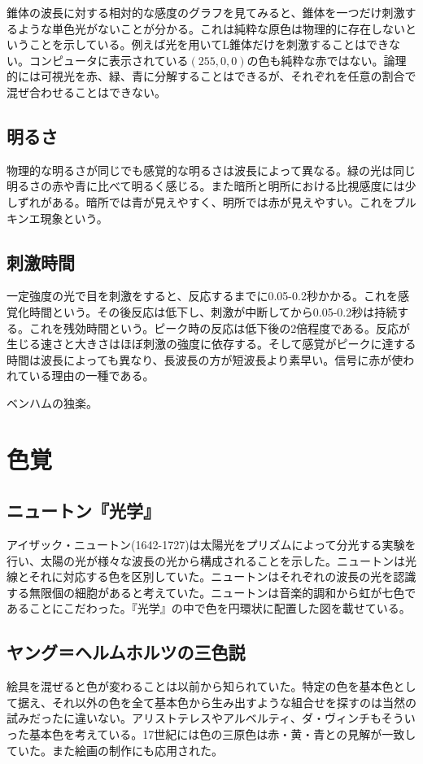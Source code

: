 	錐体の波長に対する相対的な感度のグラフを見てみると、錐体を一つだけ刺激するような単色光がないことが分かる。これは純粋な原色は物理的に存在しないということを示している。例えば光を用いてL錐体だけを刺激することはできない。コンピュータに表示されている$(255, 0, 0)$の色も純粋な赤ではない。論理的には可視光を赤、緑、青に分解することはできるが、それぞれを任意の割合で混ぜ合わせることはできない。

	\subsection{明るさ}
		物理的な明るさが同じでも感覚的な明るさは波長によって異なる。緑の光は同じ明るさの赤や青に比べて明るく感じる。また暗所と明所における比視感度には少しずれがある。暗所では青が見えやすく、明所では赤が見えやすい。これをプルキンエ現象という。
	\subsection{刺激時間}
		一定強度の光で目を刺激をすると、反応するまでに0.05-0.2秒かかる。これを感覚化時間という。その後反応は低下し、刺激が中断してから0.05-0.2秒は持続する。これを残効時間という。ピーク時の反応は低下後の2倍程度である。反応が生じる速さと大きさはほぼ刺激の強度に依存する。そして感覚がピークに達する時間は波長によっても異なり、長波長の方が短波長より素早い。信号に赤が使われている理由の一種である。

		ベンハムの独楽。
\section{色覚}
	\subsection{ニュートン『光学』}
		アイザック・ニュートン(1642-1727)は太陽光をプリズムによって分光する実験を行い、太陽の光が様々な波長の光から構成されることを示した。ニュートンは光線とそれに対応する色を区別していた。ニュートンはそれぞれの波長の光を認識する無限個の細胞があると考えていた。ニュートンは音楽的調和から虹が七色であることにこだわった。『光学』の中で色を円環状に配置した図を載せている。
	\subsection{ヤング＝ヘルムホルツの三色説}
		絵具を混ぜると色が変わることは以前から知られていた。特定の色を基本色として据え、それ以外の色を全て基本色から生み出すような組合せを探すのは当然の試みだったに違いない。アリストテレスやアルベルティ、ダ・ヴィンチもそういった基本色を考えている。17世紀には色の三原色は赤・黄・青との見解が一致していた。また絵画の制作にも応用された。

